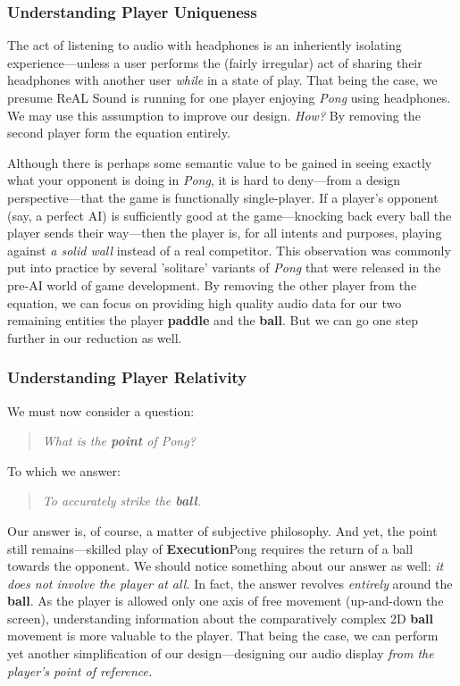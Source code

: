 \documentclass{report}
\newcommand{\rs}{ReAL Sound\xspace}
\newcommand{\exec}{\textbf{Execution}\xspace}
\newcommand{\pad}{\textbf{paddle}\xspace}
\newcommand{\ball}{\textbf{ball}\xspace}
\begin{document}
\subsubsection{Understanding Player Uniqueness}
The act of listening to audio with headphones is an inheriently isolating experience---unless a user performs the (fairly irregular) act of sharing their headphones with another user \emph{while} in a state of play. That being the case, we presume \rs is running for one player enjoying \emph{Pong} using headphones. We may use this assumption to improve our design. \emph{How?} By removing the second player form the equation entirely. 

Although there is perhaps some semantic value to be gained in seeing exactly what your opponent is doing in \emph{Pong}, it is hard to deny---from a design perspective---that the game is functionally single-player. If a player's opponent (say, a perfect AI) is sufficiently good at the game---knocking back every ball the player sends their way---then the player is, for all intents and purposes, playing against \emph{a solid wall} instead of a real competitor. This observation was commonly put into practice by several 'solitare' variants of \emph{Pong} that were released in the pre-AI world of game development. By removing the other player from the equation, we can focus on providing high quality audio data for our two remaining entities the player \pad and the \ball. But we can go one step further in our reduction as well. 


\subsubsection{Understanding Player Relativity}
We must now consider a question: 
\begin{quote}
\emph{What is the \textbf{point} of Pong?}     
\end{quote}

To which we answer:
\begin{quote}
\emph{To accurately strike the \ball.}
\end{quote}

Our answer is, of course, a matter of subjective philosophy. And yet, the point still remains---skilled play of \exec{Pong} requires the return of a ball towards the opponent. We should notice something about our answer as well: \emph{it does not involve the player at all.} In fact, the answer revolves \emph{entirely} around the \ball. As the player is allowed only one axis of free movement (up-and-down the screen), understanding information about the comparatively complex 2D \ball movement is more valuable to the player. That being the case, we can perform yet another simplification of our design---designing our audio display \emph{from the player's point of reference.} 
\end{document}
